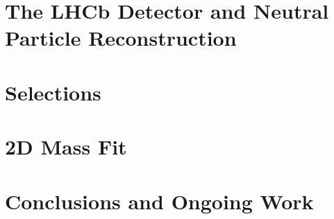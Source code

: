 \documentclass[oneside,12pt]{article}
\begin{document}
\section{The LHCb Detector and Neutral Particle Reconstruction} \label{detector}
\section{Selections} \label{selections}
\section{2D Mass Fit} \label{massfit}
\section{Conclusions and Ongoing Work} \label{conclusion}

\printbibliography[heading=bibintoc,{title=References}]
\end{document}
